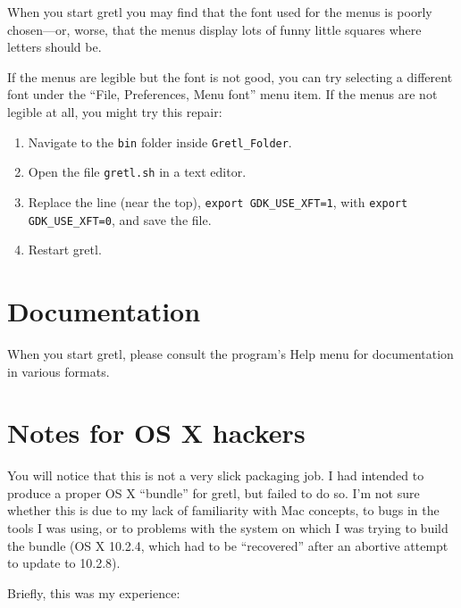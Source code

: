 \documentclass[11pt]{article}
\begin{document}
When you start gretl you may find that the font used for the menus is
poorly chosen---or, worse, that the menus display lots of funny little
squares where letters should be.

If the menus are legible but the font is not good, you can try
selecting a different font under the ``File, Preferences, Menu font''
menu item.  If the menus are not legible at all, you might try this
repair:

\begin{enumerate}
\item Navigate to the \texttt{bin} folder inside
  \texttt{Gretl\_Folder}.
\item Open the file \texttt{gretl.sh} in a text editor.
\item Replace the line (near the top), \texttt{export
    GDK\_USE\_XFT=1}, with \texttt{export GDK\_USE\_XFT=0}, and save
  the file.
\item Restart gretl.
\end{enumerate}


\section{Documentation}
\label{sec:doc}

When you start gretl, please consult the program's Help menu for
documentation in various formats.

\section{Notes for OS X hackers}
\label{sec:hack}

You will notice that this is not a very slick packaging job.  I had
intended to produce a proper OS X ``bundle'' for gretl, but failed to
do so.  I'm not sure whether this is due to my lack of familiarity
with Mac concepts, to bugs in the tools I was using, or to problems
with the system on which I was trying to build the bundle (OS X
10.2.4, which had to be ``recovered'' after an abortive attempt to
update to 10.2.8).

Briefly, this was my experience:
\end{document}
